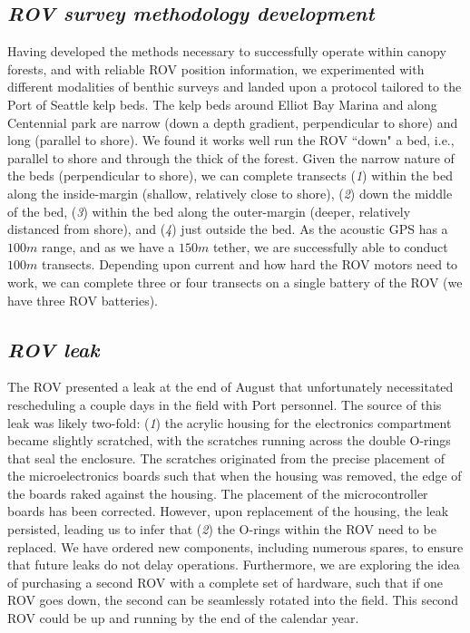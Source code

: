 \documentclass[11pt]{article}
\begin{document}
\subsection{\textit{ROV survey methodology development}}
Having developed the methods necessary to successfully operate within 
canopy forests, and with reliable ROV position information, we 
experimented with different modalities of benthic surveys and landed 
upon a protocol tailored to the Port of Seattle kelp beds. 
The kelp beds around Elliot Bay Marina and along Centennial park are 
narrow (down a depth gradient, perpendicular to shore) and long 
(parallel to shore). 
We found it works well run the ROV ``down" a bed, i.e., parallel to 
shore and through the thick of the forest. 
Given the narrow nature of the beds (perpendicular to shore), we can 
complete transects 
(\textit{1}) within the bed along the inside-margin (shallow, 
relatively close to shore), 
(\textit{2}) down the middle of the bed, 
(\textit{3}) within the bed along the outer-margin (deeper, relatively 
distanced from shore), and 
(\textit{4}) just outside the bed.
As the acoustic GPS has a $100m$ range, and as we have a $150m$ tether, 
we are successfully able to conduct $100m$ transects.  
Depending upon current and how hard the ROV motors need to work, we can 
complete three or four transects on a single battery of the ROV (we 
have three ROV batteries).

\subsection{\textit{ROV leak}}
The ROV presented a leak at the end of August that unfortunately 
necessitated rescheduling a couple days in the field with Port 
personnel. 
The source of this leak was likely two-fold: 
(\textit{1}) the acrylic housing for the electronics compartment became 
slightly scratched, with the scratches running across the double 
O-rings that seal the enclosure. 
The scratches originated from the precise placement of the 
microelectronics boards such that when the housing was removed, the 
edge of the boards raked against the housing. 
The placement of the microcontroller boards has been corrected. 
However, upon replacement of the housing, the leak persisted, leading 
us to infer that 
(\textit{2}) the O-rings within the ROV need to be replaced. 
We have ordered new components, including numerous spares, to ensure 
that future leaks do not delay operations. 
Furthermore, we are exploring the idea of purchasing a second ROV with 
a complete set of hardware, such that if one ROV goes down, the second 
can be seamlessly rotated into the field. 
This second ROV could be up and running by the end of the calendar 
year. 
\end{document}
